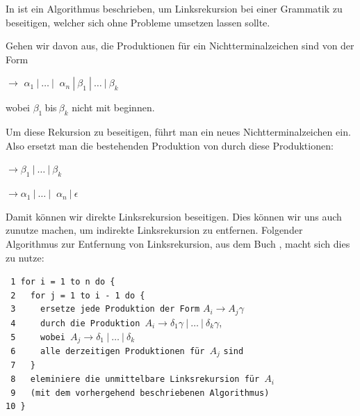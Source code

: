 In \cite{Compilers} ist ein Algorithmus beschrieben, um Linksrekursion
bei einer Grammatik zu beseitigen, welcher sich ohne Probleme umsetzen lassen
sollte.\vspace{10pt}

\noindent Gehen wir davon aus, die Produktionen für ein Nichtterminalzeichen
 sind von der Form\vspace{10pt}

 $\to$ $\alpha_1\ |\ \ldots\ |\ $
$\alpha_n\ |\ \beta_1\ |\ \ldots\ |\ \beta_k$\vspace{10pt}

\noindent wobei $\beta_1\ $bis$\ \beta_k$ nicht mit 
beginnen.\vspace{10pt}

\noindent Um diese Rekursion zu beseitigen, führt man ein neues
Nichtterminalzeichen  ein. Also ersetzt man die
bestehenden Produktion von
 durch diese Produktionen:\vspace{10pt}

 $\to \beta_1$$\ |\ \ldots\ |\
\beta_k$

 $\to \alpha_1$$\ |\ \ldots\ |\
$ $\alpha_n$$\ |\ \epsilon$\vspace{10pt}

\noindent Damit können wir direkte Linksrekursion beseitigen. Dies können wir
uns auch zunutze machen, um indirekte Linksrekursion zu entfernen. Folgender
Algorithmus zur Entfernung von Linksrekursion, aus dem Buch \cite{Compilers},
macht sich dies zu nutze:\vspace{10pt}

\noindent
\verb| 1 for i = 1 to n do {|\\
\verb| 2   for j = 1 to i - 1 do {|\\
\verb| 3     ersetze jede Produktion der Form| $A_i \to A_j \gamma$ \verb| |\\ 
\verb| 4     durch die Produktion |$A_i \to \delta_1\gamma\ |\ \ldots\ |\ \delta_k\gamma$,\\
\verb| 5     wobei |$A_j \to \delta_1\ |\ \ldots\ |\ \delta_k$\\ 
\verb| 6     alle derzeitigen Produktionen für |$A_j$ \verb|sind|\\ 
\verb| 7   }|\\
\verb| 8   eleminiere die unmittelbare Linksrekursion für |$A_i$\\
\verb| 9   (mit dem vorhergehend beschriebenen Algorithmus)|\\
\verb|10 }|
\vspace{10pt}

